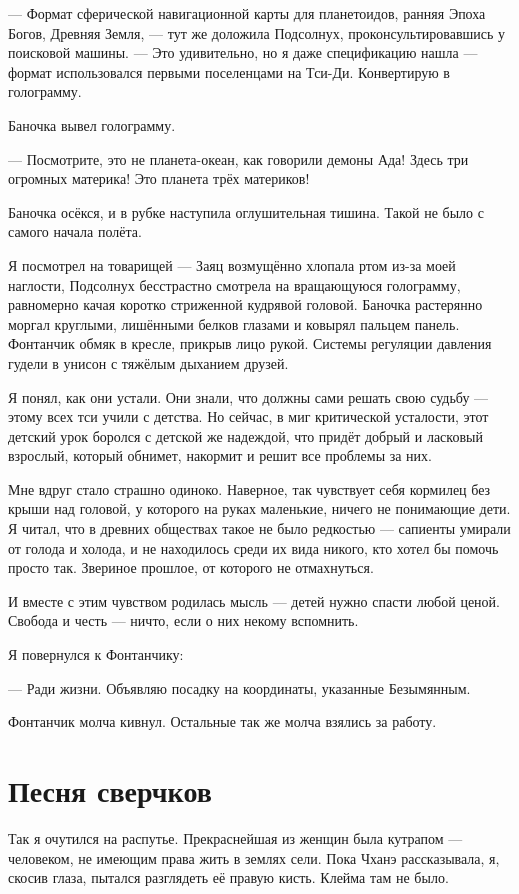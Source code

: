 --- Формат сферической навигационной карты для планетоидов, ранняя Эпоха Богов, Древняя Земля, --- тут же доложила Подсолнух, проконсультировавшись у поисковой машины.
--- Это удивительно, но я даже спецификацию нашла --- формат использовался первыми поселенцами на Тси-Ди.
Конвертирую в голограмму.

Баночка вывел голограмму.

--- Посмотрите, это не планета-океан, как говорили демоны Ада!
Здесь три огромных материка!
Это планета трёх материков!

Баночка осёкся, и в рубке наступила оглушительная тишина.
Такой не было с самого начала полёта.

Я посмотрел на товарищей --- Заяц возмущённо хлопала ртом из-за моей наглости, Подсолнух бесстрастно смотрела на вращающуюся голограмму, равномерно качая коротко стриженной кудрявой головой.
Баночка растерянно моргал круглыми, лишёнными белков глазами и ковырял пальцем панель.
Фонтанчик обмяк в кресле, прикрыв лицо рукой.
Системы регуляции давления гудели в унисон с тяжёлым дыханием друзей.

Я понял, как они устали.
Они знали, что должны сами решать свою судьбу --- этому всех тси учили с детства.
Но сейчас, в миг критической усталости, этот детский урок боролся с детской же надеждой, что придёт добрый и ласковый взрослый, который обнимет, накормит и решит все проблемы за них.

Мне вдруг стало страшно одиноко.
Наверное, так чувствует себя кормилец без крыши над головой, у которого на руках маленькие, ничего не понимающие дети.
Я читал, что в древних обществах такое не было редкостью --- сапиенты умирали от голода и холода, и не находилось среди их вида никого, кто хотел бы помочь просто так.
Звериное прошлое, от которого не отмахнуться.

И вместе с этим чувством родилась мысль --- детей нужно спасти любой ценой.
Свобода и честь --- ничто, если о них некому вспомнить.

Я повернулся к Фонтанчику:

--- Ради жизни.
Объявляю посадку на координаты, указанные Безымянным.

Фонтанчик молча кивнул.
Остальные так же молча взялись за работу.

\section{Песня сверчков}

Так я очутился на распутье.
Прекраснейшая из женщин была кутрапом --- человеком, не имеющим права жить в землях сели.
Пока Чханэ рассказывала, я, скосив глаза, пытался разглядеть её правую кисть.
Клейма там не было.

